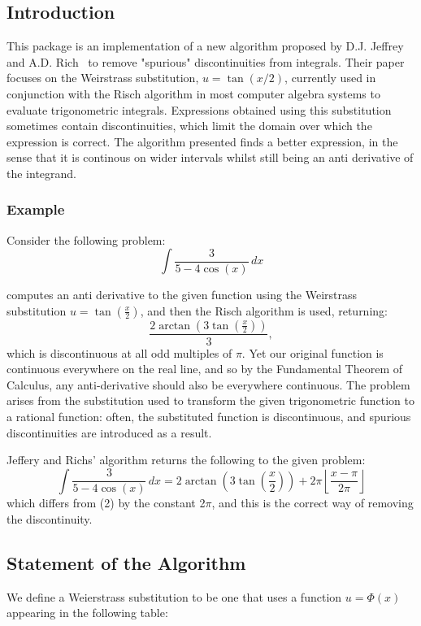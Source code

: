 \subsection{Introduction}
This package is an implementation of a new algorithm proposed by D.J. Jeffrey and A.D. Rich~\cite{JeffreyRich:94} to remove "spurious" discontinuities from integrals. Their paper focuses on the Weirstrass substitution, $u=\tan(x/2)$, currently used in conjunction with the Risch algorithm in most computer algebra systems to evaluate trigonometric integrals. Expressions obtained using this substitution sometimes contain discontinuities, which limit the domain over which the expression is correct. The algorithm presented finds a better expression, in the sense that it is continous on wider intervals whilst still being an anti derivative of the integrand.

\subsubsection{Example}
 Consider the following problem:
     \[ \int \frac{3}{5-4\cos(x)}\,dx  \]

\REDUCE computes an anti derivative to the given function using the Weirstrass substitution $u=\tan(\frac{x}{2})$, and then the Risch algorithm is used, returning:
    \[ \frac{2\arctan(3\tan(\frac{x}{2}))}{3}, \]
which is discontinuous at all odd multiples of $\pi$. Yet our original function is continuous everywhere on the real line, and so by the Fundamental Theorem of Calculus, any anti-derivative should also be everywhere continuous. The problem arises from the substitution used to transform the given trigonometric function to a rational function: often, the substituted function is discontinuous, and spurious discontinuities are introduced as a result.

Jeffery and Richs' algorithm returns the following to the given problem:
\[ \int \frac{3}{5-4\cos(x)}\,dx = 2\arctan\left(3\tan\left(\frac{x}{2}\right)\right)+2\pi\left\lfloor \frac{x-\pi}{2\pi} \right\rfloor \]
which differs from (2) by the constant 2$\pi$, and this is the correct way of removing the discontinuity.

\subsection{Statement of the Algorithm}
We define a Weierstrass substitution to be one that uses a function $u=\Phi(x)$ appearing in the following table:

